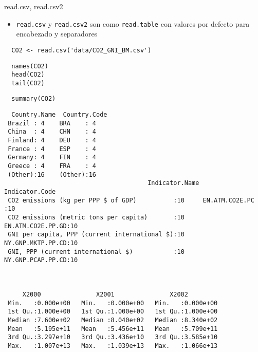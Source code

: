 \documentclass[xcolor={usenames,svgnames,dvipsnames}]{beamer}
\begin{document}
\begin{frame}[fragile,label=sec-1-2-3]{read.csv, read.csv2}
 \begin{itemize}
\item \texttt{read.csv} y \texttt{read.csv2} son como \texttt{read.table} con valores
por defecto para encabezado y separadores
\end{itemize}

\lstset{language=R,label= ,caption= ,numbers=none}
\begin{lstlisting}
  CO2 <- read.csv('data/CO2_GNI_BM.csv')
\end{lstlisting}

\lstset{language=R,label= ,caption= ,numbers=none}
\begin{lstlisting}
  names(CO2)
  head(CO2)
  tail(CO2)
\end{lstlisting}
\lstset{language=R,label= ,caption= ,numbers=none}
\begin{lstlisting}
  summary(CO2)
\end{lstlisting}

\begin{verbatim}
  Country.Name  Country.Code
 Brazil : 4    BRA    : 4   
 China  : 4    CHN    : 4   
 Finland: 4    DEU    : 4   
 France : 4    ESP    : 4   
 Germany: 4    FIN    : 4   
 Greece : 4    FRA    : 4   
 (Other):16    (Other):16   
                                       Indicator.Name           Indicator.Code
 CO2 emissions (kg per PPP $ of GDP)          :10     EN.ATM.CO2E.PC   :10    
 CO2 emissions (metric tons per capita)       :10     EN.ATM.CO2E.PP.GD:10    
 GNI per capita, PPP (current international $):10     NY.GNP.MKTP.PP.CD:10    
 GNI, PPP (current international $)           :10     NY.GNP.PCAP.PP.CD:10    
                                                                              
                                                                              
                                                                              
     X2000               X2001               X2002          
 Min.   :0.000e+00   Min.   :0.000e+00   Min.   :0.000e+00  
 1st Qu.:1.000e+00   1st Qu.:1.000e+00   1st Qu.:1.000e+00  
 Median :7.600e+02   Median :8.040e+02   Median :8.340e+02  
 Mean   :5.195e+11   Mean   :5.456e+11   Mean   :5.709e+11  
 3rd Qu.:3.297e+10   3rd Qu.:3.436e+10   3rd Qu.:3.585e+10  
 Max.   :1.007e+13   Max.   :1.039e+13   Max.   :1.066e+13  
                                                            

\end{verbatim}
\end{frame}
\end{document}
